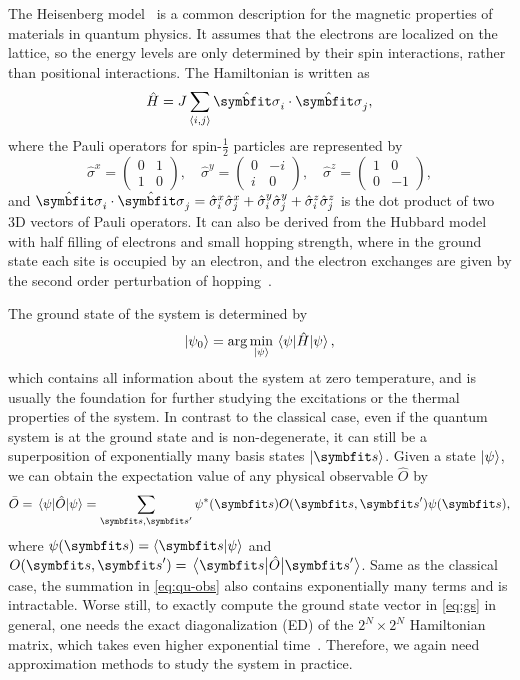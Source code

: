 The Heisenberg model~\cite{heisenberg1928theorie} is a common description for the magnetic properties of materials in quantum physics. It assumes that the electrons are localized on the lattice, so the energy levels are only determined by their spin interactions, rather than positional interactions. The Hamiltonian is written as
\begin{equation}
\hat{H} = J \sum_{\langle i, j \rangle} \hat{\vsi}_i \cdot \hat{\vsi}_j,
\label{eq:heis}
\end{equation}
where the Pauli operators for spin-$\frac{1}{2}$ particles are represented by
\begin{equation}
\hat{\sigma}^x = \begin{pmatrix} 0 & 1 \\ 1 & 0 \end{pmatrix}, \quad
\hat{\sigma}^y = \begin{pmatrix} 0 & -i \\ i & 0 \end{pmatrix}, \quad
\hat{\sigma}^z = \begin{pmatrix} 1 & 0 \\ 0 & -1 \end{pmatrix},
\end{equation}
and $\hat{\vsi}_i \cdot \hat{\vsi}_j = \hat{\sigma}^x_i \hat{\sigma}^x_j + \hat{\sigma}^y_i \hat{\sigma}^y_j + \hat{\sigma}^z_i \hat{\sigma}^z_j$ is the dot product of two 3D vectors of Pauli operators. It can also be derived from the Hubbard model with half filling of electrons and small hopping strength, where in the ground state each site is occupied by an electron, and the electron exchanges are given by the second order perturbation of hopping~\cite{cleveland1976obtaining}.

The ground state of the system is determined by
\begin{equation}
\ket{\psi_0} = \arg\min_{\ket{\psi}} \ev{\hat{H}}{\psi},
\label{eq:gs}
\end{equation}
which contains all information about the system at zero temperature, and is usually the foundation for further studying the excitations or the thermal properties of the system. In contrast to the classical case, even if the quantum system is at the ground state and is non-degenerate, it can still be a superposition of exponentially many basis states $\ket{\vs}$. Given a state $\ket{\psi}$, we can obtain the expectation value of any physical observable $\hat{O}$ by
\begin{equation}
\bar{O} = \ev{\hat{O}}{\psi} = \sum_{\vs, \vs'} \psi^*(\vs) O(\vs, \vs') \psi(\vs),
\label{eq:qu-obs}
\end{equation}
where $\psi(\vs) = \ip{\vs}{\psi}$ and $O(\vs, \vs') = \mel{\vs}{\hat{O}}{\vs'}$. Same as the classical case, the summation in \cref{eq:qu-obs} also contains exponentially many terms and is intractable. Worse still, to exactly compute the ground state vector in \cref{eq:gs} in general, one needs the exact diagonalization (ED) of the $2^N \times 2^N$ Hamiltonian matrix, which takes even higher exponential time~\cite{weisse2008exact}. Therefore, we again need approximation methods to study the system in practice.

